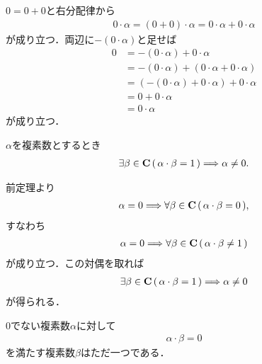 	\begin{sketch}
		$0 = 0+0$と右分配律から
		\begin{align}
			0 \cdot \alpha = (0+0) \cdot \alpha
			= 0 \cdot \alpha + 0 \cdot \alpha
		\end{align}
		が成り立つ．両辺に$-(0 \cdot \alpha)$と足せば
		\begin{align}
			0 &= -(0 \cdot \alpha) + 0 \cdot \alpha \\
			&= -(0 \cdot \alpha) + (0 \cdot \alpha + 0 \cdot \alpha) \\
			&= (-(0 \cdot \alpha) + 0 \cdot \alpha) + 0 \cdot \alpha \\
			&= 0 + 0 \cdot \alpha \\
			&= 0 \cdot \alpha
		\end{align}
		が成り立つ．
		\QED
	\end{sketch}
	
	\begin{screen}
		\begin{thm}
		\label{thm:if_has_inverse_wrt_multiplication_then_not_zero}
			$\alpha$を複素数とするとき
			\begin{align}
				\exists \beta \in \mathbf{C}\, (\, \alpha \cdot \beta = 1\, )
				\Longrightarrow \alpha \neq 0.
			\end{align}
		\end{thm}
	\end{screen}
	
	\begin{sketch}
		前定理より
		\begin{align}
			\alpha = 0 \Longrightarrow \forall \beta \in \mathbf{C}\, (\, \alpha \cdot \beta = 0\, ),
		\end{align}
		すなわち
		\begin{align}
			\alpha = 0 \Longrightarrow \forall \beta \in \mathbf{C}\, (\, \alpha \cdot \beta \neq 1\, )
		\end{align}
		が成り立つ．この対偶を取れば
		\begin{align}
			\exists \beta \in \mathbf{C}\, (\, \alpha \cdot \beta = 1\, )
			\Longrightarrow \alpha \neq 0
		\end{align}
		が得られる．
		\QED
	\end{sketch}
	
	\begin{screen}
		\begin{thm}[乗法に関する逆元はただ一つ]
			$0$でない複素数$\alpha$に対して
			\begin{align}
				\alpha \cdot \beta = 0
			\end{align}
			を満たす複素数$\beta$はただ一つである．
		\end{thm}
	\end{screen}
	

